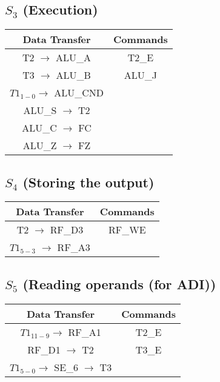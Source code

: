 \documentclass[]{article}
\begin{document}
        \subsection*{$S_3$ (Execution)} %
        \begin{center}
            \begin{tabular}{|c|c|}
                \hline
                Data Transfer & Commands \\
                \hline
                T2 $\to$ ALU\_A & T2\_E\\
                T3 $\to$ ALU\_B & ALU\_J\\
                $T1_{1-0} \to$ ALU\_CND & \\
                ALU\_S $\to$ T2 & \\
                ALU\_C $\to$ FC & \\
                ALU\_Z $\to$ FZ & \\
                \hline
            \end{tabular}
        \end{center}
        \subsection*{$S_4$ (Storing the output)}
        \begin{center}
            \begin{tabular}{|c|c|}
                \hline
                Data Transfer & Commands \\
                \hline
                T2 $\to$ RF\_D3 & RF\_WE\\
                $T1_{5-3}$ $\to$ RF\_A3 & \\                
                \hline
            \end{tabular}
        \end{center}
        \subsection*{$S_5$ (Reading operands (for ADI))}
        \begin{center}
            \begin{tabular}{|c|c|}
                \hline
                Data Transfer & Commands \\
                \hline
                $T1_{11-9} \to$ RF\_A1  & T2\_E\\
                RF\_D1 $\to$ T2 & T3\_E\\
                $T1_{5-0} \to$ SE\_6 $\to$ T3 & \\
                \hline
            \end{tabular}
        \end{center}
\end{document}
